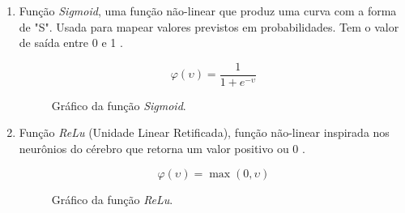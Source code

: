 \documentclass[
	12pt,				%
	openright,			%
	twoside,			%
	a4paper,			%
	english,			%
	french,				%
	spanish,			%
	brazil				%
	]{abntex2}
\begin{document}
\begin{enumerate}
	\item Função \textit{Sigmoid}, uma função não-linear que produz uma curva com a forma de "S". Usada para mapear valores previstos em probabilidades. Tem o valor de saída entre 0 e 1 \cite{gharat2019what}.
	\begin{figure}[H]
	\begin{center}
		\begin{minipage}{0.45\textwidth}
			$$\varphi(\upsilon) = \frac{1}{1 + e^{-\upsilon}}$$
		\end{minipage}
		\hfill
		\begin{minipage}{0.45\textwidth}
		\end{minipage}
	\end{center}
	\caption{Gráfico da função \textit{Sigmoid}.}
	\label{fig:grafico_sigmoid}
	\end{figure}

	\item Função \textit{ReLu} (Unidade Linear Retificada), função não-linear inspirada nos neurônios do cérebro que retorna um valor positivo ou 0 \cite{rizzo2020inteligencia}.
	\begin{figure}[H]
	\begin{center}
		\begin{minipage}{0.45\textwidth}
			$$\varphi(\upsilon) = \max(0,\upsilon)$$
		\end{minipage}
		\hfill
		\begin{minipage}{0.45\textwidth}
		\end{minipage}
	\end{center}
	\caption{Gráfico da função \textit{ReLu}.}
	\label{fig:grafico_relu}
	\end{figure}


\end{enumerate}
\end{document}

